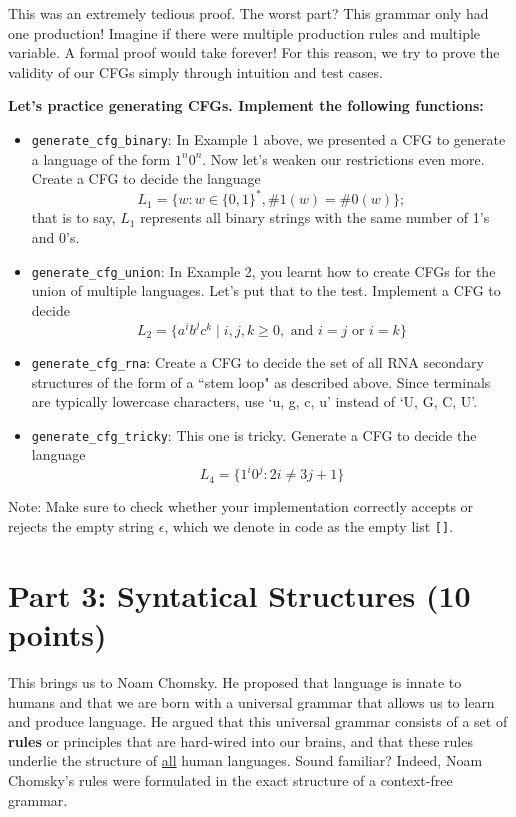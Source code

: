 \documentclass{article}
\begin{document}
    This was an extremely tedious proof. The worst part? This grammar only had one production! Imagine if there were multiple production rules and multiple variable. A formal proof would take forever! For this reason, we try to prove the validity of our CFGs simply through intuition and test cases.

\begin{tcolorbox}[enhanced,interior style={top color=Dandelion!20,bottom color=Dandelion!30}]
    \textbf{Let's practice generating CFGs. Implement the following functions:}
    
    \begin{itemize}
        \item \lstinline{generate_cfg_binary}: In Example 1 above, we presented a CFG to generate a language of the form $1^{n}0^{n}$. Now let's weaken our restrictions even more. Create a CFG to decide the language $$L_{1} = \{w : w \in \{0, 1\}^{*}, \#1(w) = \#0(w)\};$$ that is to say, $L_{1}$ represents all binary strings with the same number of 1's and 0's.
        \item \lstinline{generate_cfg_union}: In Example 2, you learnt how to create CFGs for the union of multiple languages. Let's put that to the test. Implement a CFG to decide $$L_{2} = \{a^{i}b^{j}c^{k} \mid i, j, k \ge 0, \text{ and } i = j \text{ or } i = k\}$$
        \item \lstinline{generate_cfg_rna}: Create a CFG to decide the set of all RNA secondary structures of the form of a ``stem loop" as described above. Since terminals are typically lowercase characters, use `u, g, c, u' instead of `U, G, C, U'.
        \item \lstinline{generate_cfg_tricky}: This one is tricky. Generate a CFG to decide the language $$L_{4} = \{1^{i}0^{j} : 2i \ne 3j + 1\}$$
    \end{itemize}
    Note: Make sure to check whether your implementation correctly accepts or rejects the empty string $\epsilon$, which we denote in code as the empty list \lstinline{[]}.
\end{tcolorbox}

\pagebreak
\section*{Part 3: Syntatical Structures (10 points)}
    This brings us to Noam Chomsky. He proposed that language is innate to humans and that we are born with a universal grammar that allows us to learn and produce language. He argued that this universal grammar consists of a set of \textbf{rules} or principles that are hard-wired into our brains, and that these rules underlie the structure of \underline{all} human languages. Sound familiar? Indeed, Noam Chomsky's rules were formulated in the exact structure of a context-free grammar.
\end{document}
